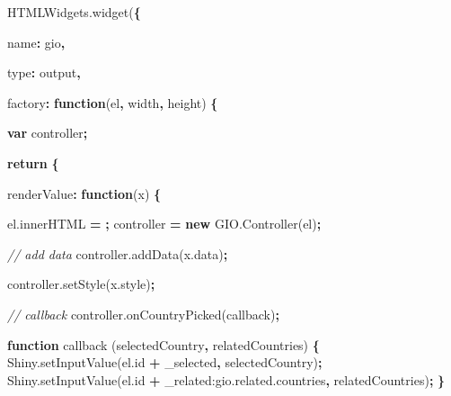 \documentclass[
]{krantz}
\makeatletter
\newenvironment{Shaded}{\begin{snugshade}}{\end{snugshade}}
\newcommand{\AttributeTok}[1]{\textcolor[rgb]{0.61,0.61,0.61}{#1}}
\newcommand{\CommentTok}[1]{\textcolor[rgb]{0.37,0.37,0.37}{\textit{#1}}}
\newcommand{\ControlFlowTok}[1]{\textcolor[rgb]{0.27,0.27,0.27}{\textbf{#1}}}
\newcommand{\DataTypeTok}[1]{\textcolor[rgb]{0.27,0.27,0.27}{#1}}
\newcommand{\KeywordTok}[1]{\textcolor[rgb]{0.27,0.27,0.27}{\textbf{#1}}}
\newcommand{\NormalTok}[1]{#1}
\newcommand{\OperatorTok}[1]{\textcolor[rgb]{0.43,0.43,0.43}{\textbf{#1}}}
\newcommand{\StringTok}[1]{\textcolor[rgb]{0.5,0.5,0.5}{#1}}
\newcommand{\VariableTok}[1]{\textcolor[rgb]{0,0,0}{#1}}
\newenvironment{kframe}{%
\medskip{}
\setlength{\fboxsep}{.8em}
 \def\at@end@of@kframe{}%
 \ifinner\ifhmode%
  \def\at@end@of@kframe{\end{minipage}}%
  \begin{minipage}{\columnwidth}%
 \fi\fi%
 \def\FrameCommand##1{\hskip\@totalleftmargin \hskip-\fboxsep
 \colorbox{shadecolor}{##1}\hskip-\fboxsep
     \hskip-\linewidth \hskip-\@totalleftmargin \hskip\columnwidth}%
 \MakeFramed {\advance\hsize-\width
   \@totalleftmargin\z@ \linewidth\hsize
   \@setminipage}}%
 {\par\unskip\endMakeFramed%
 \at@end@of@kframe}
\renewenvironment{Shaded}{\begin{kframe}}{\end{kframe}}
\makeatother
\begin{document}
\begin{Shaded}
\begin{Highlighting}[]
\VariableTok{HTMLWidgets}\NormalTok{.}\AttributeTok{widget}\NormalTok{(}\OperatorTok{\{}

  \DataTypeTok{name}\OperatorTok{:} \StringTok{\textquotesingle{}gio\textquotesingle{}}\OperatorTok{,}

  \DataTypeTok{type}\OperatorTok{:} \StringTok{\textquotesingle{}output\textquotesingle{}}\OperatorTok{,}

  \DataTypeTok{factory}\OperatorTok{:} \KeywordTok{function}\NormalTok{(el}\OperatorTok{,}\NormalTok{ width}\OperatorTok{,}\NormalTok{ height) }\OperatorTok{\{}

    \KeywordTok{var}\NormalTok{ controller}\OperatorTok{;}

    \ControlFlowTok{return} \OperatorTok{\{}

      \DataTypeTok{renderValue}\OperatorTok{:} \KeywordTok{function}\NormalTok{(x) }\OperatorTok{\{}

        \VariableTok{el}\NormalTok{.}\AttributeTok{innerHTML} \OperatorTok{=} \StringTok{\textquotesingle{}\textquotesingle{}}\OperatorTok{;}
\NormalTok{        controller }\OperatorTok{=} \KeywordTok{new} \VariableTok{GIO}\NormalTok{.}\AttributeTok{Controller}\NormalTok{(el)}\OperatorTok{;}
        
        \CommentTok{// add data}
        \VariableTok{controller}\NormalTok{.}\AttributeTok{addData}\NormalTok{(}\VariableTok{x}\NormalTok{.}\AttributeTok{data}\NormalTok{)}\OperatorTok{;}

        \VariableTok{controller}\NormalTok{.}\AttributeTok{setStyle}\NormalTok{(}\VariableTok{x}\NormalTok{.}\AttributeTok{style}\NormalTok{)}\OperatorTok{;}

        \CommentTok{// callback}
        \VariableTok{controller}\NormalTok{.}\AttributeTok{onCountryPicked}\NormalTok{(callback)}\OperatorTok{;}

        \KeywordTok{function} \AttributeTok{callback}\NormalTok{ (selectedCountry}\OperatorTok{,}\NormalTok{ relatedCountries) }\OperatorTok{\{}
          \VariableTok{Shiny}\NormalTok{.}\AttributeTok{setInputValue}\NormalTok{(}\VariableTok{el}\NormalTok{.}\AttributeTok{id} \OperatorTok{+} \StringTok{\textquotesingle{}\_selected\textquotesingle{}}\OperatorTok{,}\NormalTok{ selectedCountry)}\OperatorTok{;}
          \VariableTok{Shiny}\NormalTok{.}\AttributeTok{setInputValue}\NormalTok{(}\VariableTok{el}\NormalTok{.}\AttributeTok{id} \OperatorTok{+} \StringTok{\textquotesingle{}\_related:gio.related.countries\textquotesingle{}}\OperatorTok{,}\NormalTok{ relatedCountries)}\OperatorTok{;}
        \OperatorTok{\}}


\end{Highlighting}
\end{Shaded}
\end{document}
